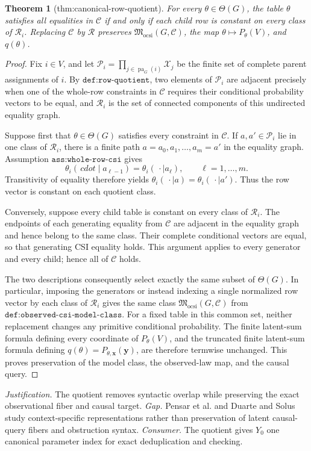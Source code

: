\documentclass{article}
\newtheorem{theorem}{Theorem}
\begin{document}
\begin{theorem}[thm:canonical-row-quotient]\label{thm:canonical-row-quotient}
For every \(\theta\in\Theta(G)\), the table \(\theta\) satisfies all equalities in \(\mathcal C\) if and only if each child row is constant on every class of \(\mathcal R_i\). Replacing \(\mathcal C\) by \(\mathcal R\) preserves \(\mathfrak M_{\mathrm{ocsi}}(G,\mathcal C)\), the map \(\theta\mapsto P_{\theta}(V)\), and \(q(\theta)\).
\end{theorem}
\begin{proof}
Fix \(i\in V\), and let \(\mathcal P_i=\prod_{j\in\operatorname{pa}_G(i)}\mathcal X_j\) be the finite set of complete parent assignments of \(i\). By \(\texttt{def:row-quotient}\), two elements of \(\mathcal P_i\) are adjacent precisely when one of the whole-row constraints in \(\mathcal C\) requires their conditional probability vectors to be equal, and \(\mathcal R_i\) is the set of connected components of this undirected equality graph.

Suppose first that \(\theta\in\Theta(G)\) satisfies every constraint in \(\mathcal C\). If \(a,a'\in\mathcal P_i\) lie in one class of \(\mathcal R_i\), there is a finite path \(a=a_0,a_1,\ldots,a_m=a'\) in the equality graph. Assumption \(\texttt{ass:whole-row-csi}\) gives
\[
 \theta_i(\,cdot\mid a_{\ell-1})=\theta_i(\,\cdot\mid a_\ell),
 \qquad \ell=1,\ldots,m.
\]
Transitivity of equality therefore yields \(\theta_i(\,\cdot\mid a)=\theta_i(\,\cdot\mid a')\). Thus the row vector is constant on each quotient class.

Conversely, suppose every child table is constant on every class of \(\mathcal R_i\). The endpoints of each generating equality from \(\mathcal C\) are adjacent in the equality graph and hence belong to the same class. Their complete conditional vectors are equal, so that generating CSI equality holds. This argument applies to every generator and every child; hence all of \(\mathcal C\) holds.

The two descriptions consequently select exactly the same subset of \(\Theta(G)\). In particular, imposing the generators or instead indexing a single normalized row vector by each class of \(\mathcal R_i\) gives the same class \(\mathfrak M_{\mathrm{ocsi}}(G,\mathcal C)\) from \(\texttt{def:observed-csi-model-class}\). For a fixed table in this common set, neither replacement changes any primitive conditional probability. The finite latent-sum formula defining every coordinate of \(P_\theta(V)\), and the truncated finite latent-sum formula defining \(q(\theta)=P_{\theta,\mathbf x}(\mathbf y)\), are therefore termwise unchanged. This proves preservation of the model class, the observed-law map, and the causal query.
\end{proof}
\par\smallskip\noindent \textit{Justification.} The quotient removes syntactic overlap while preserving the exact observational fiber and causal target. \textit{Gap.} Pensar et al. and Duarte and Solus study context-specific representations rather than preservation of latent causal-query fibers and obstruction syntax. \textit{Consumer.} The quotient gives \(Y_0\) one canonical parameter index for exact deduplication and checking.
\end{document}

